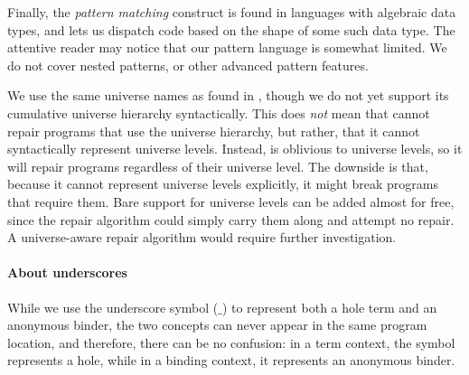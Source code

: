 Finally, the \emph{pattern matching} construct is found in languages with
algebraic data types, and lets us dispatch code based on the shape of some such
data type.  The attentive reader may notice that our pattern language is
somewhat limited.  We do not cover nested patterns, or other advanced pattern
features.

We use the same universe names as found in \Gallina{}, though we do not yet
support its cumulative universe hierarchy syntactically.  This does \emph{not}
mean that \Chick{} cannot repair \Gallina{} programs that use the universe
hierarchy, but rather, that it cannot syntactically represent universe levels.
Instead, \Chick{} is oblivious to universe levels, so it will repair programs
regardless of their universe level.  The downside is that, because it cannot
represent universe levels explicitly, it might break programs that require them.
Bare support for universe levels can be added almost for free, since the repair
algorithm could simply carry them along and attempt no repair.  A universe-aware
repair algorithm would require further investigation.

\paragraph{About underscores} While we use the underscore symbol ($\_$) to
represent both a hole term and an anonymous binder, the two concepts can never
appear in the same program location, and therefore, there can be no confusion:
in a term context, the symbol represents a hole, while in a binding context, it
represents an anonymous binder.
